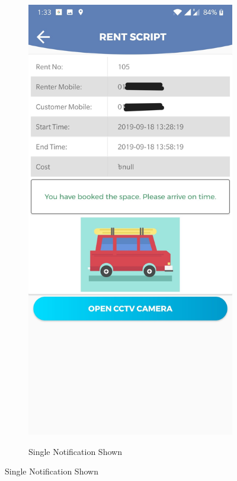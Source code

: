 \documentclass[12pt, english]{article}
\begin{document}
\begin{figure}[h!]
\begin{subfigure}[t]{0.4\textwidth}
    \end{subfigure}
    \begin{subfigure}[t]{0.4\textwidth}
    \includegraphics[width=\linewidth]{Notification/notification.jpg}
        \label{arch50}
        \caption{Single Notification Shown}
    \end{subfigure}
    \label{fig:arp_os}
\end{figure}
\end{document}
